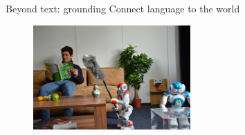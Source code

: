 \documentclass[usenames,dvipsnames,notes,11pt,aspectratio=169]{beamer}
\begin{document}
\begin{frame}
    {Beyond text: grounding}
    Connect language to the world

    \begin{center}
        \begin{figure}
        \includegraphics[height=4cm]{figures/robot-home}
        \end{figure}
    \end{center}
\end{frame}
\end{document}
